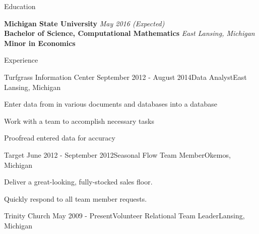 \documentclass{resume}
\begin{document}


\begin{rSection}{Education}


{\bf Michigan State University} \hfill {\em May 2016 (Expected)} \\
{\bf Bachelor of Science, Computational Mathematics} \hfill {\em East Lansing, Michigan} \\
{\bf Minor in Economics}

\end{rSection}





\begin{rSection}{Experience}

\begin{rSubsection}{Turfgrass Information Center}
{September 2012 - August 2014}{Data Analyst}{East Lansing, Michigan}
\item Enter data from in various documents and databases into a database
\item Work with a team to accomplish necessary tasks
\item Proofread entered data for accuracy
\end{rSubsection}
\begin{rSubsection}{Target}
{June 2012 - September 2012}{Seasonal Flow Team Member}{Okemos, Michigan}
\item Deliver a great-looking, fully-stocked sales floor.
\item Quickly respond to all team member requests.
\end{rSubsection}
\begin{rSubsection}{Trinity Church}
{May 2009 - Present}{Volunteer Relational Team Leader}{Lansing, Michigan}
\end{rSubsection}
\end{rSection}
\end{document}
